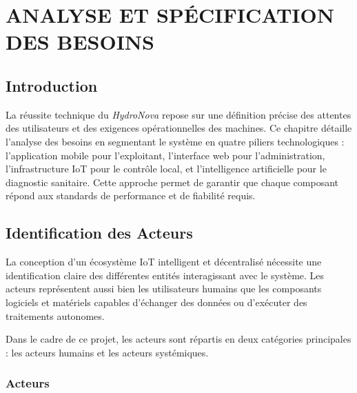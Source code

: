 
\chapter{ANALYSE ET SPÉCIFICATION DES BESOINS}

\section*{Introduction}

La réussite technique du \textit{HydroNova} repose sur une définition précise des attentes des utilisateurs et des exigences opérationnelles des machines. Ce chapitre détaille l'analyse des besoins en segmentant le système en quatre piliers technologiques : l'application mobile pour l'exploitant, l'interface web pour l'administration, l'infrastructure IoT pour le contrôle local, et l'intelligence artificielle pour le diagnostic sanitaire. Cette approche permet de garantir que chaque composant répond aux standards de performance et de fiabilité requis.

\section{Identification des Acteurs}

La conception d’un écosystème IoT intelligent et décentralisé nécessite une identification claire des différentes entités interagissant avec le système. Les acteurs représentent aussi bien les utilisateurs humains que les composants logiciels et matériels capables d’échanger des données ou d’exécuter des traitements autonomes.

Dans le cadre de ce projet, les acteurs sont répartis en deux catégories principales : les acteurs humains et les acteurs systémiques.


\subsection{Acteurs}

